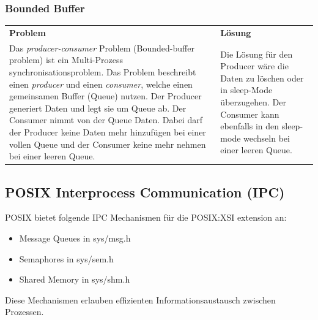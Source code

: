 \subsubsection{Bounded Buffer}
\begin{tabular}{| p{8cm} |  p{8cm} |}
  \hline \textbf{Problem} & \textbf{Lösung}
  \\ Das \textit{producer-consumer} Problem (Bounded-buffer problem) ist ein Multi-Prozess synchronisationsproblem. 
  Das Problem beschreibt einen \textit{producer} und einen \textit{consumer}, welche einen gemeinsamen Buffer (Queue) nutzen. 
  Der Producer generiert Daten und legt sie um Queue ab. Der Consumer nimmt von der Queue Daten. Dabei darf der Producer keine Daten 
  mehr hinzufügen bei einer vollen Queue und der Consumer keine mehr nehmen bei einer leeren Queue.
  &
  Die Lösung für den Producer wäre die Daten zu löschen oder in sleep-Mode überzugehen. Der Consumer kann ebenfalls in den sleep-mode 
  wechseln bei einer leeren Queue.
  \\\hline
\end{tabular}

\subsection{POSIX Interprocess Communication (IPC)}
POSIX bietet folgende IPC Mechanismen für die POSIX:XSI extension an:
\begin{itemize}
  \item Message Queues in sys/msg.h
  \item Semaphores in sys/sem.h
  \item Shared Memory in sys/shm.h
\end{itemize}
Diese Mechanismen erlauben effizienten Informationsaustausch zwischen Prozessen.

